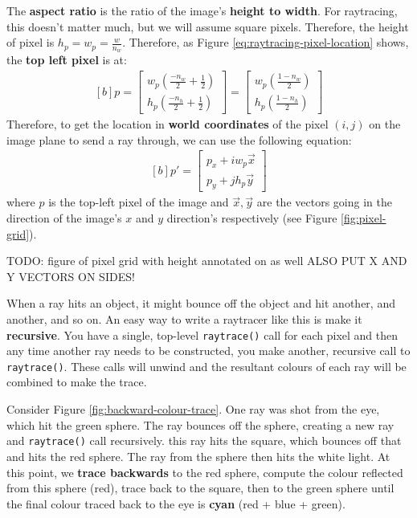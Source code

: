 \documentclass{article}
\begin{document}
The \textbf{aspect ratio} is the ratio of the image's \textbf{height to width}. For raytracing, this doesn't matter much, but we will assume square pixels. Therefore, the height of pixel is $h_p = w_p = \frac{w}{n_w}$. Therefore, as Figure \ref{eq:raytracing-pixel-location} shows, the \textbf{top left pixel} is at:
\begin{equation}
	\begin{aligned}[b]
	p = \left[ \begin{matrix}
		w_p\left( \frac{-n_w}{2} + \frac{1}{2} \right) \\
		h_p\left( \frac{-n_h}{2} + \frac{1}{2} \right)
	\end{matrix}\right]
	= \left[ \begin{matrix}
		w_p\left( \frac{1 - n_w}{2} \right) \\
		h_p\left( \frac{1 - n_h}{2} \right)
	\end{matrix}\right]
	\end{aligned}
\end{equation}
Therefore, to get the location in \textbf{world coordinates} of the pixel $(i,j)$ on the image plane to send a ray through, we can use the following equation:
\begin{equation}
	\begin{aligned}[b]
	p'= \left[ \begin{matrix}
		p_x + i w_p \vec{x} \\
		p_y + j h_p \vec{y}
	\end{matrix}\right]
	\end{aligned}
	\label{eq:pixel-centre-raytracing}
\end{equation}
where $p$ is the top-left pixel of the image and $\vec{x},\vec{y}$ are the vectors going in the direction of the image's $x$ and $y$ direction's respectively (see Figure \ref{fig:pixel-grid}).

TODO: figure of pixel grid with height annotated on as well ALSO PUT X AND Y VECTORS ON SIDES!

When a ray hits an object, it might bounce off the object and hit another, and another, and so on. An easy way to write a raytracer like this is make it \textbf{recursive}. You have a single, top-level \texttt{raytrace()} call for each pixel and then any time another ray needs to be constructed, you make another, recursive call to \texttt{raytrace()}. These calls will unwind and the resultant colours of each ray will be combined to make the trace.

Consider Figure \ref{fig:backward-colour-trace}. One ray was shot from the eye, which hit the green sphere. The ray bounces off the sphere, creating a new ray and \texttt{raytrace()} call recursively. this ray hits the square, which bounces off that and hits the red sphere. The ray from the sphere then hits the white light. At this point, we \textbf{trace backwards} to the red sphere, compute the colour reflected from this sphere (red), trace back to the square, then to the green sphere until the final colour traced back to the eye is \textbf{cyan} (red + blue + green).
\end{document}
